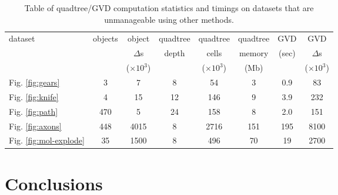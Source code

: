 \documentclass[submission]{gmp2017}
\begin{document}
\begin{table*}
  \centering
  \footnotesize{
  \begin{tabular}{l c c c c c c c}
    \toprule
    dataset & objects & object          & quadtree   & quadtree          & quadtree &
    GVD   & GVD             \\
            &         & $\Delta$s       & depth    & cells           & memory &
    (sec) & $\Delta$s       \\
            &         & ($\times 10^3$) &          & ($\times 10^3$) & (Mb)   &
          & ($\times 10^3$) \\
    \midrule
    Fig. \ref{fig:gears} & 3 & 7 & 8 & 54 & 3 & 0.9 & 83\\
    Fig. \ref{fig:knife} & 4 & 15 & 12 & 146 & 9 & 3.9 & 232 \\
    Fig. \ref{fig:path} & 470 & 5 & 24 & 158 & 8 & 2.0 & 151 \\
    Fig. \ref{fig:axons} & 448 & 4015 & 8 & 2716 & 151 & 195 & 8100 \\
    Fig. \ref{fig:mol-explode} & 35 & 1500 & 8 & 496 & 70 & 19 & 2700 \\
    \bottomrule
  \end{tabular}}
  \caption{Table of quadtree/GVD computation statistics and timings on datasets that are unmanageable using other methods. }
  \label{tab:timings}
\end{table*}


\section{Conclusions}
\end{document}
